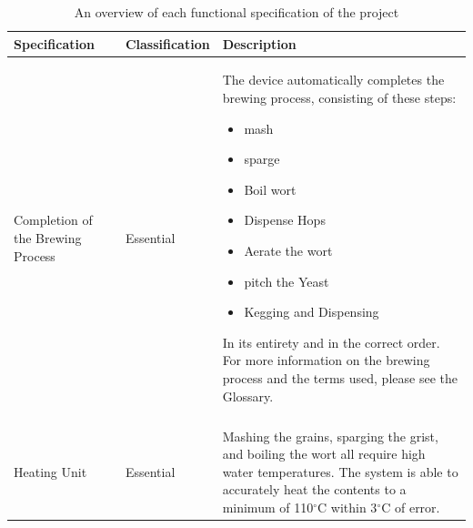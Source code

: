 \documentclass{article}
\begin{document}
\begin{table}[H]
\caption{An overview of each functional specification of the project}
\centering
\begin{tabularx}{\textwidth}{l l Z}
\toprule
\textbf{Specification} & \textbf{Classification} & \textbf{Description} \\ 
\midrule
Completion of the Brewing Process
& Essential	
& The device automatically completes the brewing process, consisting of these steps:
\begin{itemize}
\item \Gls{mash}
\item \Gls{sparge}
\item Boil \Gls{wort}
\item Dispense Hops
\item Aerate the \Gls{wort}
\item \Gls{pitch} the Yeast
\item Kegging and Dispensing
\end{itemize}
\noindent In its entirety and in the correct order.  For more information on the brewing process and the terms used, please see the Glossary.
\\\\
Heating Unit
& Essential
& Mashing the grains, sparging the \gls{grist}, and boiling the \gls{wort} all require high water temperatures. The system is able to accurately heat the contents to a minimum of 110$^{\circ}$C within 3$^{\circ}$C of error.
\\
\end{tabularx}
\end{table}
\end{document}
